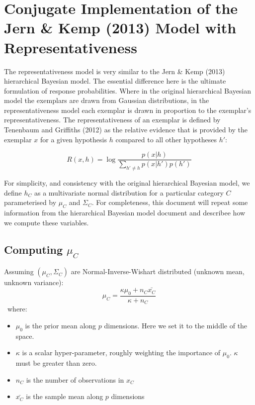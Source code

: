 \documentclass[12pt]{article}
\begin{document}
\VerbatimFootnotes

\section*{Conjugate Implementation of the Jern \& Kemp (2013) Model with Representativeness}

The representativeness model is very similar to the Jern \& Kemp (2013)
hierarchical Bayesian model. The essential difference here is the ultimate
formulation of response probabilities. Where in the original hierarchical
Bayesian model the exemplars are drawn from Gaussian distributions, in the
representativeness model each exemplar is drawn in proportion to the exemplar's
representativeness. The representativeness of an exemplar is defined by
Tenenbaum and Griffiths (2012) as the relative evidence that is provided by the
exemplar $x$ for a given hypothesis $h$ compared to all other hypotheses $h'$:

\begin{equation}
  R(x,h) = \log \dfrac{p(x|h)}{\sum_{h'\neq h}{p(x|h')p(h')}}
\label{representativeness}
\end{equation}

For simplicity, and consistency with the original hierarchical Bayesian model,
we define $h_{C}$ as a multivariate normal distribution for a particular
category $C$ parameterised by $\mu_C$ and $\Sigma_C$. For completeness, this
document will repeat some information from the hierarchical Bayesian model
document and describee how we compute these variables.

\subsection*{Computing $\mu_C$}
Assuming $(\mu_C, \Sigma_C)$ are Normal-Inverse-Wishart distributed (unknown mean, unknown variance):
\
\begin{equation}
  \mu_C = \dfrac
    {\kappa\mu_{0} + n_C \bar{x_C}}
    {\kappa + n_C}
    \label{eq:category_mus}
\end{equation}
\ 
where:
\begin{itemize}
    \setlength\itemsep{-0.5em}
    \item $\mu_{0}$ is the prior mean along $p$ dimensions. Here we set it to the middle of the space.
    \item $\kappa$ is a scalar hyper-parameter, roughly weighting the importance of $\mu_{0}$. $\kappa$ must be greater than zero.
    \item $n_C$ is the number of observations in $x_C$
    \item $\bar{x_C}$ is the sample mean along $p$ dimensions
\end{itemize}
\end{document}
